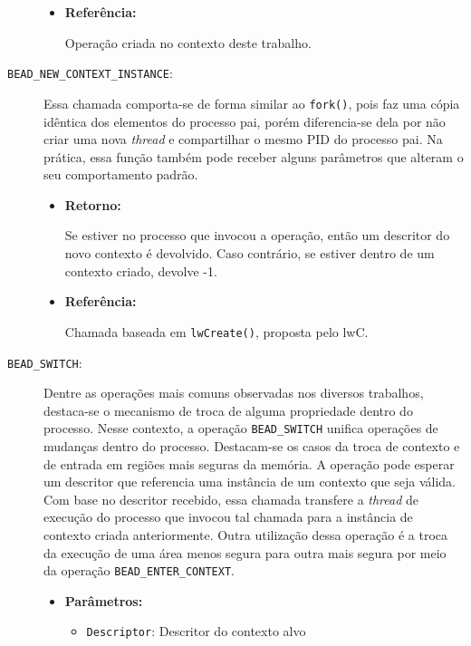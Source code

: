\begin{description}
\begin{itemize}
    \item \textbf{Referência:}

Operação criada no contexto deste trabalho.

  \end{itemize}

  \item [\texttt{BEAD\_NEW\_CONTEXT\_INSTANCE}:]

Essa chamada comporta-se de forma similar ao \texttt{fork()}, pois
faz uma cópia idêntica dos elementos do processo pai, porém diferencia-se dela
por não criar uma nova \emph{thread} e
compartilhar o mesmo PID do processo pai. Na prática, essa função também pode
receber alguns parâmetros que alteram o seu comportamento padrão.

  \begin{itemize}
    \item \textbf{Retorno:}

Se estiver no processo que invocou a operação, então um descritor do novo
contexto é devolvido. Caso contrário, se estiver dentro de um contexto criado,
devolve -1.

    \item \textbf{Referência:}

Chamada baseada em \texttt{lwCreate()}, proposta pelo lwC.

  \end{itemize}

  \item [\texttt{BEAD\_SWITCH}:]

Dentre as operações mais comuns observadas nos diversos trabalhos, destaca-se o
mecanismo de troca de alguma propriedade dentro do processo. Nesse contexto, a
operação \texttt{BEAD\_SWITCH} unifica operações de mudanças dentro do
processo. Destacam-se os casos da troca de contexto e de entrada em regiões
mais seguras da memória. A operação pode esperar um descritor que referencia uma
instância de um contexto que seja válida. Com base no descritor recebido, essa
chamada transfere a \emph{thread} de execução do processo que invocou tal chamada para
a instância de contexto criada anteriormente. Outra utilização dessa operação é
a troca da execução de uma área menos segura para outra mais segura por meio da
operação \texttt{BEAD\_ENTER\_CONTEXT}.

  \begin{itemize}
    \item \textbf{Parâmetros:} 

    \begin{itemize}
      \item \texttt{Descriptor}: Descritor do contexto alvo
    \end{itemize}


\end{itemize}
\end{description}
